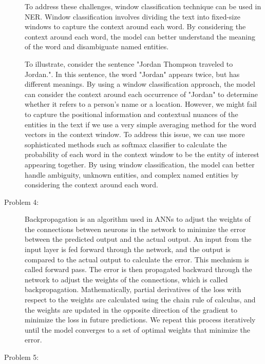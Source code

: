 \documentclass[12pt]{article}
\begin{document}
\begin{description}
  To address these challenges, window classification technique can be used in NER. Window classification involves dividing the text into fixed-size windows
  to capture the context around each word. By considering the context around each word, the model can better understand the meaning of the word and disambiguate named entities.

  To illustrate, consider the sentence "Jordan Thompson traveled to Jordan.". In this sentence, the word "Jordan" appears twice, but has different meanings.
  By using a window classification approach, the model can consider the context around each occurrence of "Jordan" to determine whether it refers to a person's name or a location.
  However, we might fail to capture the positional information and contextual nuances of the entities in the text if we use a very simple averaging method for the word vectors in the context window.
  To address this issue, we can use more sophisticated methods such as softmax classifier to calculate the probability of each word in the context window to be the entity of interest appearing together.
  By using window classification, the model can better handle ambiguity, unknown entities, and complex named entities by considering the context around each word.

  \pagebreak

  \item[Problem 4:] \hfill %
  
  Backpropagation is an algorithm used in ANNs to adjust the weights of the connections between neurons in the network to minimize the error between the predicted output 
  and the actual output.
  An input from the input layer is fed forward through the network, and the output is compared to the actual output to calculate the error. This mechnism is called forward pass.
  The error is then propagated backward through the network to adjust the weights of the connections, which is called backpropagation. Mathematically, partial derivatives of the loss
  with respect to the weights are calculated using the chain rule of calculus, and the weights are updated in the opposite direction of the gradient to minimize the loss in future predictions.
  We repeat this process iteratively until the model converges to a set of optimal weights that minimize the error.



  \pagebreak

  \item[Problem 5:] \hfill %
  

\end{description}
\end{document}

